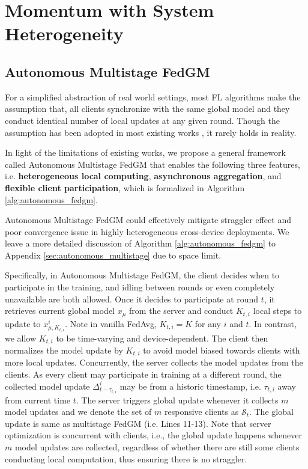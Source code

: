 \section{Momentum with System Heterogeneity}
\label{sec:autonomous}

\subsection{Autonomous Multistage FedGM}

For a simplified abstraction of real world settings, most FL algorithms make the assumption that, all clients synchronize with the same global model and they conduct identical number of local updates at any given round. Though the assumption has been adopted in most existing works \citep{McMahan2017FedAvg,Hsu2019MeasuringTE,Li20FedProx,karimireddy2020scaffold,reddi2020adaptive,bao2022doubly, wang22adaptive}, it rarely holds in reality.

In light of the limitations of existing works, we propose a general framework called Autonomous Multistage FedGM that enables the following three features, i.e. \textbf{heterogeneous local computing}, \textbf{asynchronous aggregation}, and \textbf{flexible client participation}, which is formalized in Algorithm \ref{alg:autonomous_fedgm}. 

Autonomous Multistage FedGM could effectively mitigate straggler effect and poor convergence issue in highly heterogeneous cross-device deployments. We leave a more detailed discussion of Algorithm \ref{alg:autonomous_fedgm} to Appendix \ref{sec:autonomous_multistage} due to space limit.

Specifically, in Autonomous Multistage FedGM, the client decides when to participate in the training, and idling between rounds or even completely unavailable are both allowed. Once it decides to participate at round $t$, it retrieves current global model $x_\mu$ from the server and conduct $K_{t,i}$ local steps to update to $x^i_{\mu,K_{t,i}}$. Note in vanilla FedAvg, $K_{t,i}=K$ for any $i$ and $t$. In contrast, we allow $K_{t,i}$ to be time-varying and device-dependent. The client then normalizes the model update by $K_{t,i}$ to avoid model biased towards clients with more local updates. Concurrently, the server collects the model updates from the clients. As every client may participate in training at a different round, the collected model update $\Delta_{t-\tau_{t,i}}^i$ may be from a historic timestamp, i.e. $\tau_{t,i}$ away from current time $t$. The server triggers global update whenever it collects $m$ model updates and we denote the set of $m$ responsive clients as $\mathcal{S}_t$. The global update is same as multistage FedGM (i.e. Lines 11-13). Note that server optimization is concurrent with clients, i.e., the global update happens whenever $m$ model updates are collected, regardless of whether there are still some clients conducting local computation, thus ensuring there is no straggler.


